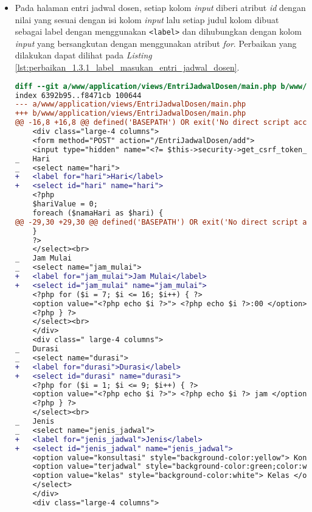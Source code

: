 \begin{itemize}
\item Pada halaman entri jadwal dosen, setiap kolom \textit{input} diberi atribut \textit{id} dengan nilai yang sesuai dengan isi kolom \textit{input} lalu setiap judul kolom dibuat sebagai label dengan menggunakan \texttt{<label>} dan dihubungkan dengan kolom \textit{input} yang bersangkutan dengan menggunakan atribut \textit{for}. Perbaikan yang dilakukan dapat dilihat pada \textit{Listing} \ref{lst:perbaikan_1.3.1_label_masukan_entri_jadwal_dosen}.
\begin{lstlisting}[frame=single, label={lst:perbaikan_1.3.1_label_masukan_entri_jadwal_dosen}, language=diff, caption=Perbaikan Kriteria Sukses 1.3.1 pada Kolom \textit{Input} di Halaman Entri Jadwal Dosen]
diff --git a/www/application/views/EntriJadwalDosen/main.php b/www/application/views/EntriJadwalDosen/main.php
index 6392b95..f8471cb 100644
--- a/www/application/views/EntriJadwalDosen/main.php
+++ b/www/application/views/EntriJadwalDosen/main.php
@@ -16,8 +16,8 @@ defined('BASEPATH') OR exit('No direct script access allowed');
    <div class="large-4 columns">
    <form method="POST" action="/EntriJadwalDosen/add">
    <input type="hidden" name="<?= $this->security->get_csrf_token_name() ?>" value="<?= $this->security->get_csrf_hash() ?>" />
_   Hari
_   <select name="hari"> 
+   <label for="hari">Hari</label>
+   <select id="hari" name="hari">
    <?php
    $hariValue = 0;
    foreach ($namaHari as $hari) {
@@ -29,30 +29,30 @@ defined('BASEPATH') OR exit('No direct script access allowed');
    }
    ?>
    </select><br>
_   Jam Mulai
_   <select name="jam_mulai"> 
+   <label for="jam_mulai">Jam Mulai</label>
+   <select id="jam_mulai" name="jam_mulai"> 
    <?php for ($i = 7; $i <= 16; $i++) { ?>
    <option value="<?php echo $i ?>"> <?php echo $i ?>:00 </option>
    <?php } ?>
    </select><br>
    </div>
    <div class=" large-4 columns">
_   Durasi
_   <select name="durasi"> 
+   <label for="durasi">Durasi</label>
+   <select id="durasi" name="durasi"> 
    <?php for ($i = 1; $i <= 9; $i++) { ?>
    <option value="<?php echo $i ?>"> <?php echo $i ?> jam </option>
    <?php } ?>
    </select><br>
_   Jenis  
_   <select name="jenis_jadwal"> 
+   <label for="jenis_jadwal">Jenis</label>
+   <select id="jenis_jadwal" name="jenis_jadwal"> 
    <option value="konsultasi" style="background-color:yellow"> Konsultasi </option>
    <option value="terjadwal" style="background-color:green;color:white"> Terjadwal</option>
    <option value="kelas" style="background-color:white"> Kelas </option>
    </select>
    </div>
    <div class="large-4 columns">

\end{lstlisting}
\end{itemize}
